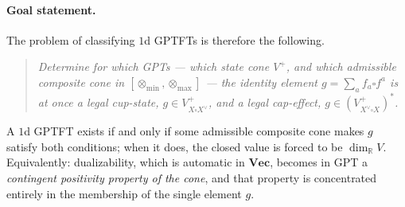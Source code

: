 \documentclass[prl,aps,10pt,superscriptaddress, floatfix]{revtex4-2}
\begin{document}
\paragraph*{Goal statement.}
The problem of classifying $1$d GPTFTs is therefore the following.
\begin{quote}
\emph{Determine for which GPTs --- which state cone $V^+$, and which admissible composite cone in $[\otimes_{\min},\otimes_{\max}]$ --- the identity element $g=\sum_a f_a\square f^a$ is at once a legal cup-state, $g\in V_{X\square X^\vee}^+$, and a legal cap-effect, $g\in(V_{X^\vee\square X}^+)^*$.}
\end{quote}
A $1$d GPTFT exists if and only if some admissible composite cone makes $g$ satisfy both conditions; when it does, the closed value is forced to be $\dim_{\mathbb R}V$. Equivalently: dualizability, which is automatic in $\mathbf{Vec}$, becomes in GPT a \emph{contingent positivity property of the cone}, and that property is concentrated entirely in the membership of the single element $g$.
\end{document}
